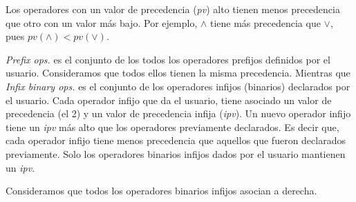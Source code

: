 \documentclass[a4paper,11pt]{article}
\begin{document}
Los operadores con un valor de precedencia (\textit{pv}) alto tienen menos precedencia que otro con un valor más bajo.
Por ejemplo, $\wedge$ tiene más precedencia que $\vee$, pues $pv (\wedge) < pv (\vee)$.

\textit{Prefix ops.} es el conjunto de los todos los operadores prefijos definidos por el usuario. Consideramos
que todos ellos tienen la misma precedencia.
Mientras que \textit{Infix binary ops.} es el conjunto de los operadores infijos (binarios) declarados por el usuario.
Cada operador infijo que da el usuario, tiene asociado un valor de precedencia (el 2) y un valor de precedencia infija (\textit{ipv}).
Un nuevo operador infijo tiene un \textit{ipv} más alto que los operadores previamente declarados.
Es decir que, cada operador infijo tiene menos precedencia que aquellos que fueron declarados previamente.
Solo los operadores binarios infijos dados por el usuario mantienen un \textit{ipv}.

Consideramos que todos los operadores binarios infijos asocian a derecha.
\end{document}

